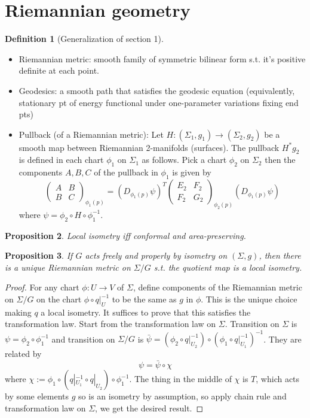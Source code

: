 \documentclass{article}
\theoremstyle{definition}
\newtheorem{defn}{Definition}[section]
\theoremstyle{remark}
\theoremstyle{plain}
\newtheorem{prop}[defn]{Proposition}
\theoremstyle{definition}
\begin{document}
\section{Riemannian geometry}
\begin{defn}[Generalization of section 1]
    \begin{itemize}
        \item Riemannian metric: smooth family of symmetric bilinear form s.t. it's positive definite at each point.
        \item Geodesics: a smooth path that satisfies the geodesic equation (equivalently, stationary pt of energy functional under one-parameter variations fixing end pts)
        \item Pullback (of a Riemannian metric): Let $H:(\Sigma_1,g_1)\to(\Sigma_2,g_2)$ be a smooth map between Riemannian 2-manifolds (surfaces). The pullback $H^\ast g_2$ is defined in each chart $\phi_1$ on $\Sigma_1$ as follows. Pick a chart $\phi_2$ on $\Sigma_2$ then the components $A,B,C$ of the pullback in $\phi_1$ is given by
        \[\begin{pmatrix}
            A&B\\ B&C
        \end{pmatrix}_{\phi_1(p)}=(D_{\phi_1(p)}\psi)^T\begin{pmatrix}
            E_2&F_2\\ F_2&G_2
        \end{pmatrix}_{\phi_2(p)}(D_{\phi_1(p)}\psi)\]
        where $\psi=\phi_2\circ H\circ\phi_1^{-1}$.
    \end{itemize}
\end{defn}
\begin{prop}
    Local isometry iff conformal and area-preserving.
\end{prop}
\begin{prop}
    If $G$ acts freely and properly by isometry on $(\Sigma,g)$, then there is a unique Riemannian metric on $\Sigma/G$ s.t. the quotient map is a local isometry.
\end{prop}
\begin{proof}
    For any chart $\phi:U\to V$ of $\Sigma$, define components of the Riemannian metric on $\Sigma/G$ on the chart $\phi\circ q|_U^{-1}$ to be the same as $g$ in $\phi$. This is the unique choice making $q$ a local isometry. It suffices to prove that this satisfies the transformation law. Start from the transformation law on $\Sigma$. Transition on $\Sigma$ is $\psi=\phi_2\circ\phi_1^{-1}$ and transition on $\Sigma/G$ is $\bar\psi=(\phi_2\circ q|_{U_2}^{-1})\circ (\phi_1\circ q|_{U_1}^{-1})^{-1}$. They are related by
    \[\psi=\bar\psi\circ \chi\]
    where $\chi:=\phi_1\circ (q|_{U_1}^{-1}\circ q|_{U_2})\circ \phi_1^{-1}$. The thing in the middle of $\chi$ is $T$, which acts by some elements $g$ so is an isometry by assumption, so apply chain rule and transformation law on $\Sigma$, we get the desired result.
\end{proof}
\end{document}
